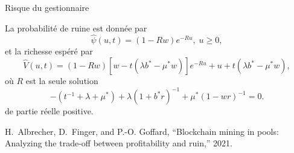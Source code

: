 \documentclass{beamer}
\def \w{\widehat}
\begin{document}
\begin{frame}{Risque du gestionnaire}
\scriptsize
\begin{tcolorbox}[enhanced,drop shadow, title=Théorème (Pertes et profits du gestionnaire)]
La probabilité de ruine est donnée par 
\begin{equation*}\label{psiexpe}
    \widehat{\psi}(u,t) = (1-Rw)  e^{-R u},\;u\ge 0,
\end{equation*}
et la richesse espéré par
\begin{equation*}\label{Vcombexpe}
    \w{V}(u,t) = (1 - Rw)[w-t(\lambda b^\ast-\mu^\ast w)] e^{-R u}+u+t(\lambda b^\ast-\mu^\ast w),
\end{equation*}
où $R$ est la seule solution 
\begin{equation*} \label{VLunde}
    -(t^{-1}+\lambda+\mu^\ast)+\lambda(1+b^\ast r)^{-1}+\mu^\ast(1-wr)^{-1}=0.
\end{equation*}
de partie réelle positive.
\end{tcolorbox}
\tiny
  \begin{thebibliography}{1}

H.~Albrecher, D.~Finger, and P.-O. Goffard, ``Blockchain mining in pools:
  Analyzing the trade-off between profitability and ruin,'' 2021.


\end{thebibliography}
\end{frame}
\end{document}
